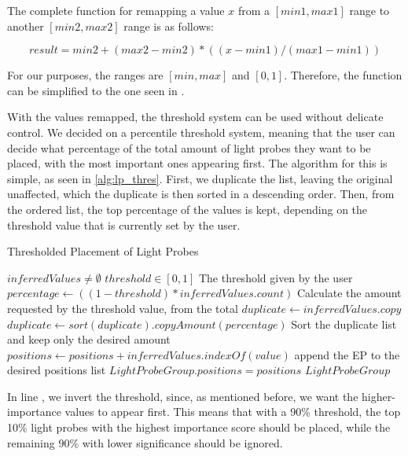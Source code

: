 The complete function for remapping a value $x$ from a \([min1, max1]\) range to another \([min2, max2]\) range is as follows:

\[ result = min2 + (max2 - min2) * ((x - min1)/(max1 - min1)) \]

For our purposes, the ranges are \([min, max]\) and \([0, 1]\). Therefore, the function can be simplified to the one seen in .

With the values remapped, the threshold system can be used without delicate control. We decided on a percentile threshold system, meaning that the user can decide what percentage of the total amount of light probes they want to be placed, with the most important ones appearing first. The algorithm for this is simple, as seen in \ref{alg:lp_thres}. First, we duplicate the list, leaving the original unaffected, which the duplicate is then sorted in a descending order. Then, from the ordered list, the top percentage of the values is kept, depending on the threshold value that is currently set by the user.

\begin{algorithm}
	\caption{Thresholded Placement of Light Probes}
	\label{alg:lp_thres}
	\begin{algorithmic}[1]
		\Require $inferredValues \neq \emptyset$
		\Require $threshold \in [0, 1]$
		\Comment The threshold given by the user
		\State $percentage \gets ((1-threshold) * inferredValues.count)$
		\Comment Calculate the amount requested by the threshold value, from the total
		\label{alg:lp_thres:1}
		\State $duplicate \gets inferredValues.copy$
		\State $duplicate \gets sort(duplicate).copyAmount(percentage)$
		\Comment Sort the duplicate list and keep only the desired amount
			\State $positions \gets positions + inferredValues.indexOf(value)$
			\Comment append the EP to the desired positions list
		\EndFor
		\State $LightProbeGroup.positions = positions$
		\State \Return $Light Probe Group$
	\end{algorithmic}
\end{algorithm}

In line , we invert the threshold, since, as mentioned before, we want the higher-importance values to appear first. This means that with a 90\% threshold, the top 10\% light probes with the highest importance score should be placed, while the remaining 90\% with lower significance should be ignored.\newline 

